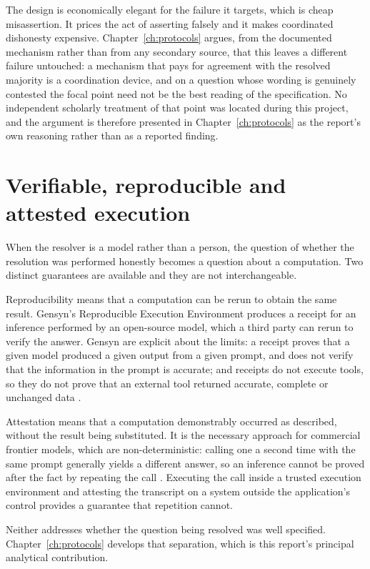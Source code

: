 The design is economically elegant for the failure it targets, which is cheap misassertion.
It prices the act of asserting falsely and it makes coordinated dishonesty expensive.
Chapter~\ref{ch:protocols} argues, from the documented mechanism rather than from any
secondary source, that this leaves a different failure untouched: a mechanism that pays for
agreement with the resolved majority is a coordination device, and on a question whose
wording is genuinely contested the focal point need not be the best reading of the
specification. No independent scholarly treatment of that point was located during this
project, and the argument is therefore presented in Chapter~\ref{ch:protocols} as the
report's own reasoning rather than as a reported finding.

\section{Verifiable, reproducible and attested execution}
\label{sec:bg-verif}

When the resolver is a model rather than a person, the question of whether the resolution
was performed honestly becomes a question about a computation. Two distinct guarantees are
available and they are not interchangeable.

Reproducibility means that a computation can be rerun to obtain the same result. Gensyn's
Reproducible Execution Environment produces a receipt for an inference performed by an
open-source model, which a third party can rerun to verify the answer. Gensyn are explicit
about the limits: a receipt proves that a given model produced a given output from a given
prompt, and does not verify that the information in the prompt is accurate; and receipts do
not execute tools, so they do not prove that an external tool returned accurate, complete or
unchanged data \cite{gensyn2026receipts}.

Attestation means that a computation demonstrably occurred as described, without the result
being substituted. It is the necessary approach for commercial frontier models, which are
non-deterministic: calling one a second time with the same prompt generally yields a
different answer, so an inference cannot be proved after the fact by repeating the call
\cite{truebit2026orchestration}. Executing the call inside a trusted execution environment
and attesting the transcript on a system outside the application's control
provides a guarantee that repetition cannot.

Neither addresses whether the question being resolved was well specified.
Chapter~\ref{ch:protocols} develops that separation, which is this report's principal
analytical contribution.

